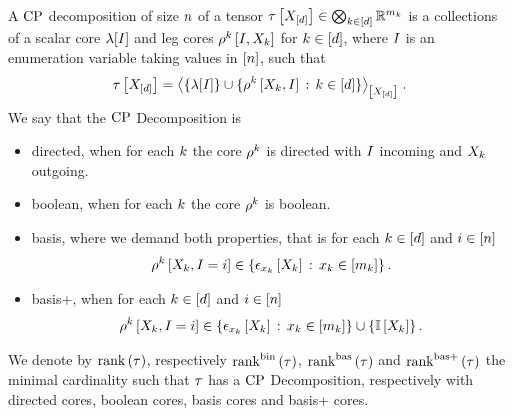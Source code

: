 \begin{definition}
    \label{def:cpFormats}
    A $\mathrm{CP}$ decomposition of size $n$ of a tensor $ \tau\left[X_{[d]}\right]\in\bigotimes_{k\in[d]} \mathbb{R}^{m_{k}}$ is a collections of a scalar core $\lambda[I]$ and leg cores $\rho^{k}\left[I,X_{k}\right]$ for $k\in[d]$, where $I$ is an enumeration variable taking values in $[n]$, such that
    \begin{align*}
        \tau\left[X_{[d]}\right]
        = \left\langle 
            \{\lambda[I]\} \cup \{ \rho^{k}\left[X_{k},I\right] \,:\, k\in[d] \}
        \right\rangle_{\left[ X_{[d]} \right]} \, .
    \end{align*}
    We say that the $\mathrm{CP}$ Decomposition is
    \begin{itemize}
        \item directed, when for each $k$ the core $\rho^{k}$ is directed with $I$ incoming and $X_{k}$ outgoing.
        \item boolean, when for each $k$ the core $\rho^{k}$ is boolean.
        \item basis, where we demand both properties, that is for each $k\in[d]$ and $i\in[n]$
        \begin{align*}
            \rho^{k}\left[X_{k},I=i\right]
            \in\{\epsilon_{x_{k}}\left[X_{k}\right] \,:\, x_{k}\in[m_{k}] \}\, .
        \end{align*}
        \item basis+, when for each $k\in[d]$ and $i\in[n]$  %
        \begin{align*}
            \rho^{k}\left[X_{k},I=i\right]
            \in\{\epsilon_{x_{k}}\left[X_{k}\right] \,:\, x_{k}\in[m_{k}] \} \cup \{\mathbb{I}\left[X_{k}\right]\}\, .
        \end{align*}
    \end{itemize}
    We denote by $\mathrm{rank}\left(\tau\right)$, respectively $\mathrm{rank}^{\mathrm{bin}}\left(\tau\right)$, $\mathrm{rank}^{\mathrm{bas}}\left(\tau\right)$ and $\mathrm{rank}^{\mathrm{bas+}}\left(\tau\right)$ the minimal cardinality such that $\tau$ has a $\mathrm{CP}$ Decomposition, respectively with directed cores, boolean cores, basis cores and basis+ cores.
\end{definition}

